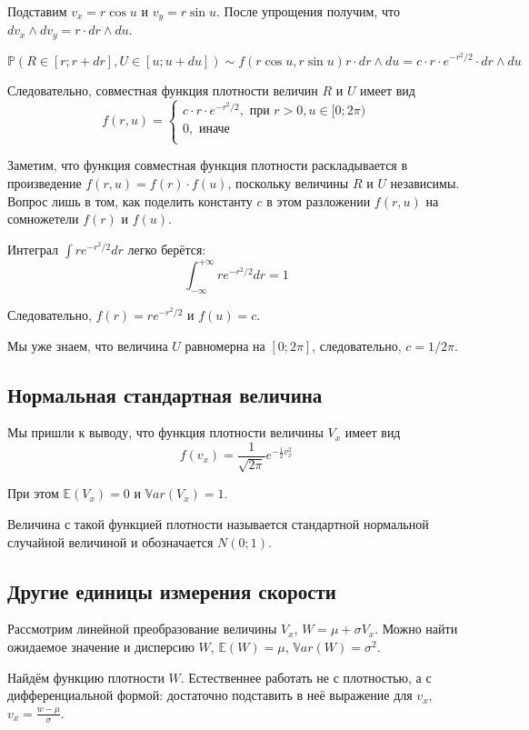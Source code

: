 \documentclass[11pt,russian,]{article}
\newcommand{\E}{\mathbb{E}}
\newcommand{\Var}{\mathbb{V}ar}
\renewcommand{\P}{\mathbb{P}}
\begin{document}
Подставим \(v_x = r\cos u\) и \(v_y = r\sin u\). После упрощения
получим, что \(dv_x \wedge dv_y = r \cdot dr \wedge du\).

\[
\P(R \in [r;r+dr], U\in [u;u+du]) \sim f(r\cos u, r\sin u) r \cdot dr \wedge du = c \cdot r \cdot e^{-r^2/2} \cdot dr \wedge du
\]

Следовательно, совместная функция плотности величин \(R\) и \(U\) имеет
вид \[
f(r, u) = 
\begin{cases}
c \cdot r \cdot e^{-r^2/2}, \text{ при } r>0, u \in [0;2\pi) \\
0, \text{ иначе} \\
\end{cases}
\]

Заметим, что функция совместная функция плотности раскладывается в
произведение \(f(r, u) = f(r) \cdot f(u)\), поскольку величины \(R\) и
\(U\) независимы. Вопрос лишь в том, как поделить константу \(c\) в этом
разложении \(f(r, u)\) на сомножетели \(f(r)\) и \(f(u)\).

Интеграл \(\int r e^{-r^2/2} dr\) легко берётся: \[
\int_{-\infty}^{+\infty} r e^{-r^2/2} dr = 1
\]

Следовательно, \(f(r) = r e^{-r^2/2}\) и \(f(u) = c\).

Мы уже знаем, что величина \(U\) равномерна на \([0;2\pi]\),
следовательно, \(c=1/2\pi\).

\subsection{Нормальная стандартная величина}\label{--}

Мы пришли к выводу, что функция плотности величины \(V_x\) имеет вид \[
f(v_x) = \frac{1}{\sqrt{2\pi}} e^{-\frac{1}{2}v_x^2}
\]

При этом \(\E(V_x)=0\) и \(\Var(V_x)=1\).

Величина с такой функцией плотности называется стандартной нормальной
случайной величиной и обозначается \(N(0;1)\).

\subsection{Другие единицы измерения скорости}\label{---}

Рассмотрим линейной преобразование величины \(V_x\),
\(W = \mu + \sigma V_x\). Можно найти ожидаемое значение и дисперсию
\(W\), \(\E(W) = \mu\), \(\Var(W) = \sigma^2\).

Найдём функцию плотности \(W\). Естественнее работать не с плотностью, а
с дифференциальной формой: достаточно подставить в неё выражение для
\(v_x\), \(v_x = \frac{w-\mu}{\sigma}\).
\end{document}
